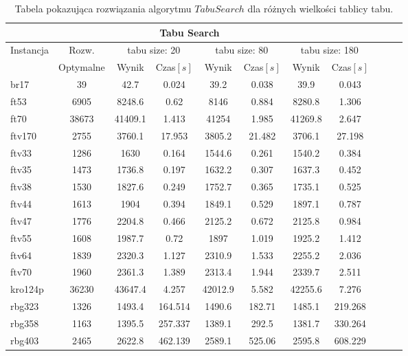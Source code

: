 \begin{center}
\begin{table}
\begin{tabular}{lcccccccccc}

\toprule
\multicolumn{8}{c}{Tabu Search} \\
\midrule
\multirow{2}{*}{Instancja} & {Rozw.} &
\multicolumn{2}{c}{tabu size: 20} & \multicolumn{2}{c}{tabu size: 80} & 
\multicolumn{2}{c}{tabu size: 180}
 \\
 & Optymalne & Wynik & Czas$[s]$ & Wynik & Czas$[s]$ & Wynik & Czas$[s]$ 
  \\
\toprule
br17 & 39 & 42.7 & 0.024 & 39.2 & 0.038 & 39.9 & 0.043 \\
\midrule
ft53 & 6905 & 8248.6 & 0.62 & 8146 & 0.884 & 8280.8 & 1.306 \\
\midrule
ft70 & 38673 & 41409.1 & 1.413 & 41254 & 1.985 & 41269.8 & 2.647 \\
\midrule
ftv170 & 2755 & 3760.1 & 17.953 & 3805.2 & 21.482 & 3706.1 & 27.198 \\
\midrule
ftv33 & 1286 & 1630 & 0.164 & 1544.6 & 0.261 & 1540.2 & 0.384 \\
\midrule
ftv35 & 1473 & 1736.8 & 0.197 & 1632.2 & 0.307 & 1637.3 & 0.452 \\
\midrule
ftv38 & 1530 & 1827.6 & 0.249 & 1752.7 & 0.365 & 1735.1 & 0.525 \\
\midrule
ftv44 & 1613 & 1904 & 0.394 & 1849.1 & 0.529 & 1897.1 & 0.787 \\
\midrule
ftv47 & 1776 & 2204.8 & 0.466 & 2125.2 & 0.672 & 2125.8 & 0.984 \\
\midrule
ftv55 & 1608 & 1987.7 & 0.72 & 1897 & 1.019 & 1925.2 & 1.412 \\
\midrule
ftv64 & 1839 & 2320.3 & 1.127 & 2310.9 & 1.533 & 2255.2 & 2.036 \\
\midrule
ftv70 & 1960 & 2361.3 & 1.389 & 2313.4 & 1.944 & 2339.7 & 2.511 \\
\midrule
kro124p & 36230 & 43647.4 & 4.257 & 42012.9 & 5.582 & 42255.6 & 7.276 \\
\midrule
rbg323 & 1326 & 1493.4 & 164.514 & 1490.6 & 182.71 & 1485.1 & 219.268 \\
\midrule
rbg358 & 1163 & 1395.5 & 257.337 & 1389.1 & 292.5 & 1381.7 & 330.264 \\
\midrule
rbg403 & 2465 & 2622.8 & 462.139 & 2589.1 & 525.06 & 2595.8 & 608.229 \\
\bottomrule
\end{tabular}
\caption{Tabela pokazująca rozwiązania algorytmu $Tabu Search$ dla różnych 
wielkości tablicy tabu.}
\label{diferent_tabu_size_table}
\end{table}
\end{center}



